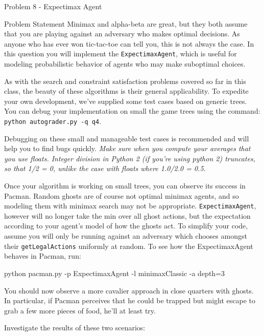 \begin{problem}{Problem 8 - Expectimax Agent}
    \begin{statement}{Problem Statement}
        Minimax and alpha-beta are great, but they both assume that you are playing against an adversary who makes optimal decisions. As anyone who has ever won tic-tac-toe can tell you, this is not 
        always the case. In this question you will implement the \texttt{ExpectimaxAgent}, which is useful for modeling probabilistic behavior of agents who may make suboptimal choices.

        As with the search and constraint satisfaction problems covered so far in this class, the beauty of these algorithms is their general applicability. To expedite your own development, we've 
        supplied some test cases based on generic trees. You can debug your implementation on small the game trees using the command: \texttt{python autograder.py -q q4}. 
        
        Debugging on these small and manageable test cases is recommended and will help you to find bugs quickly. \textit{Make sure when you compute your averages that you use floats. Integer division 
        in Python 2 (if you're using python 2) truncates, so that 1/2 = 0, unlike the case with floats where 1.0/2.0 = 0.5.}

        Once your algorithm is working on small trees, you can observe its success in Pacman. Random ghosts are of course not optimal minimax agents, and so modeling them with minimax search may not 
        be appropriate. \texttt{ExpectimaxAgent}, however will no longer take the min over all ghost actions, but the expectation according to your agent's model of how the ghosts act. To simplify 
        your code, assume you will only be running against an adversary which chooses amongst their \texttt{getLegalActions} uniformly at random. To see how the ExpectimaxAgent behaves in Pacman, run:

    \begin{code}[Bash]
    python pacman.py -p ExpectimaxAgent -l minimaxClassic -a depth=3
    \end{code}

        You should now observe a more cavalier approach in close quarters with ghosts. In particular, if Pacman perceives that he could be trapped but might escape to grab a few more pieces of food, he'll at least try.

        Investigate the results of these two scenarios:


\end{statement}
\end{problem}
